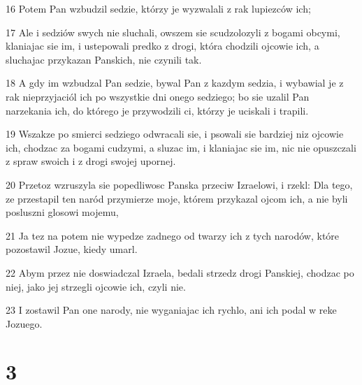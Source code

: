 \par 16 Potem Pan wzbudzil sedzie, którzy je wyzwalali z rak lupiezców ich;
\par 17 Ale i sedziów swych nie sluchali, owszem sie scudzolozyli z bogami obcymi, klaniajac sie im, i ustepowali predko z drogi, która chodzili ojcowie ich, a sluchajac przykazan Panskich, nie czynili tak.
\par 18 A gdy im wzbudzal Pan sedzie, bywal Pan z kazdym sedzia, i wybawial je z rak nieprzyjaciól ich po wszystkie dni onego sedziego; bo sie uzalil Pan narzekania ich, do którego je przywodzili ci, którzy je uciskali i trapili.
\par 19 Wszakze po smierci sedziego odwracali sie, i psowali sie bardziej niz ojcowie ich, chodzac za bogami cudzymi, a sluzac im, i klaniajac sie im, nic nie opuszczali z spraw swoich i z drogi swojej upornej.
\par 20 Przetoz wzruszyla sie popedliwosc Panska przeciw Izraelowi, i rzekl: Dla tego, ze przestapil ten naród przymierze moje, którem przykazal ojcom ich, a nie byli posluszni glosowi mojemu,
\par 21 Ja tez na potem nie wypedze zadnego od twarzy ich z tych narodów, które pozostawil Jozue, kiedy umarl.
\par 22 Abym przez nie doswiadczal Izraela, bedali strzedz drogi Panskiej, chodzac po niej, jako jej strzegli ojcowie ich, czyli nie.
\par 23 I zostawil Pan one narody, nie wyganiajac ich rychlo, ani ich podal w reke Jozuego.

\chapter{3}

